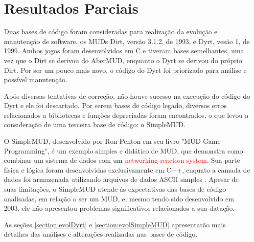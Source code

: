 \chapter[Resultados Parciais]{Resultados Parciais}
\label{chapter:resultadosParciais}

Duas bases de código foram consideradas para realização da evolução e manutenção de software, os MUDs 
Dirt, versão 3.1.2, de 1993, e Dyrt, vesão 1, de 1999.  Ambos jogos foram desenvolvidos em C e tiveram 
bases semelhantes, uma vez que o Dirt se derivou do AberMUD, enquanto o Dyrt se derivou do próprio Dirt. 
Por ser um pouco mais novo, o código do Dyrt foi priorizado para análise e possível manutenção.

Após diversas tentativas de correção, não houve sucesso na execução do código do Dyrt e ele foi descartado. 
Por serem bases de código legado, diversos erros relacionados a bibliotecas e funções depreciadas foram 
encontrados, o que levou a consideração de uma terceira base de código: o SimpleMUD.

O SimpleMUD, desenvolvido por Ron Penton em seu livro "MUD Game Programming", é um exemplo simples e 
didático de MUD, que demonstra como combinar um sistema de dados com um \textcolor{red}{networking reaction system}. 
Sua parte física e lógica foram desenvolvidas exclusivamente em C++, enquato a camada de dados foi armazenada 
utilizando arquivos de dados ASCII simples \cite{penton2003mud}. Apesar de suas limitações, o SimpleMUD 
atende às expectativas das bases de código analisadas, em relação a ser um MUD, e, mesmo tendo sido 
desenvolvido em 2003, ele não apresentou problemas significativos relacionados a sua datação.

As seções \ref{section:evolDyrt} e \ref{section:evolSimpleMUD} apresentarão mais detalhes das análises e alterações realizadas nas bases de código.